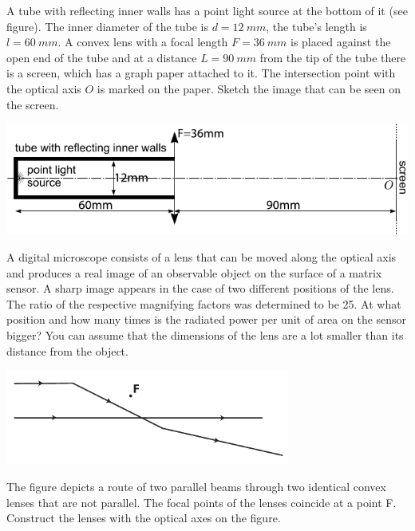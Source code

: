 \documentclass[11pt]{article}
\begin{document}
\probeng
A tube with reflecting inner walls has a point light source at the bottom of it (see figure). The inner diameter of the tube is $d=\SI{12}{mm}$, the tube’s length is $l=\SI{60}{mm}$. A convex lens with a focal length $F=\SI{36}{mm}$ is placed against the open end of the tube and at a distance $L=\SI{90}{mm}$ from the tip of the tube there is a screen, which has a graph paper attached to it. The intersection point with the optical axis $O$ is marked on the paper. Sketch the image that can be seen on the screen.
\begin{center}
\includegraphics[width=\textwidth]{2012-v3g-06-toru-valgusallikas-lxxts_ing}
\end{center}
\probend
\bigskip


\probeng
A digital microscope consists of a lens that can be moved along the optical axis and produces a real image of an observable object on the surface of a matrix sensor. A sharp image appears in the case of two different positions of the lens. The ratio of the respective magnifying factors was determined to be 25. At what position and how many times is the radiated power per unit of area on the sensor bigger? You can assume that the dimensions of the lens are a lot smaller than its distance from the object.
\probend
\bigskip


\probeng
\begin{center}
  \includegraphics[width=0.7\textwidth]{2014-lahg-07-optilineskeemjoonis}
\end{center}
The figure depicts a route of two parallel beams through two identical convex lenses that are not parallel. The focal points of the lenses coincide at a point F. Construct the lenses with the optical axes on the figure.
\probend
\bigskip
\end{document}
